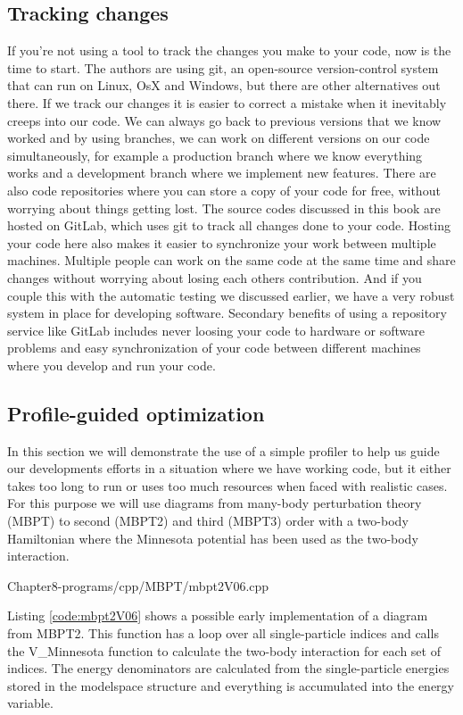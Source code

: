 \subsection{Tracking changes}
If you're not using a tool to track the changes you make to your code, now is
the time to start. The authors are using git, an open-source version-control
system that can run on Linux, OsX and Windows, but there are other alternatives
out there. If we track our changes it is easier to correct a mistake when it
inevitably creeps into our code. We can always go back to previous versions that
we know worked and by using branches, we can work on different versions on our
code simultaneously, for example a production branch where we know everything
works and a development branch where we implement new features. There are also
code repositories where you can store a copy of your code for free, without
worrying about things getting lost. The source codes discussed in this book are
hosted on GitLab, which uses git to track all changes done to your code. Hosting
your code here also makes it easier to synchronize your work between multiple
machines. Multiple people can work on the same code at the same time and share
changes without worrying about losing each others contribution. And if you
couple this with the automatic testing we discussed earlier, we have a very
robust system in place for developing software. Secondary benefits of using a
repository service like GitLab includes never loosing your code to hardware or
software problems and easy synchronization of your code between different
machines where you develop and run your code.

\subsection{Profile-guided optimization}
In this section we will demonstrate the use of a simple profiler to help us
guide our developments efforts in a situation where we have working code, but it
either takes too long to run or uses too much resources when faced with
realistic cases. For this purpose we will use diagrams from many-body
perturbation theory (MBPT) to second (MBPT2) and third (MBPT3) order with a
two-body Hamiltonian where the Minnesota potential has been used as the two-body
interaction.

{Chapter8-programs/cpp/MBPT/mbpt2V06.cpp}

Listing \ref{code:mbpt2V06} shows a possible early implementation of a diagram from
MBPT2. This function has a loop over all single-particle indices and calls the
V\_Minnesota function to calculate the two-body interaction for each set of
indices. The energy denominators are calculated from the single-particle
energies stored in the modelspace structure and everything is accumulated into
the energy variable.

